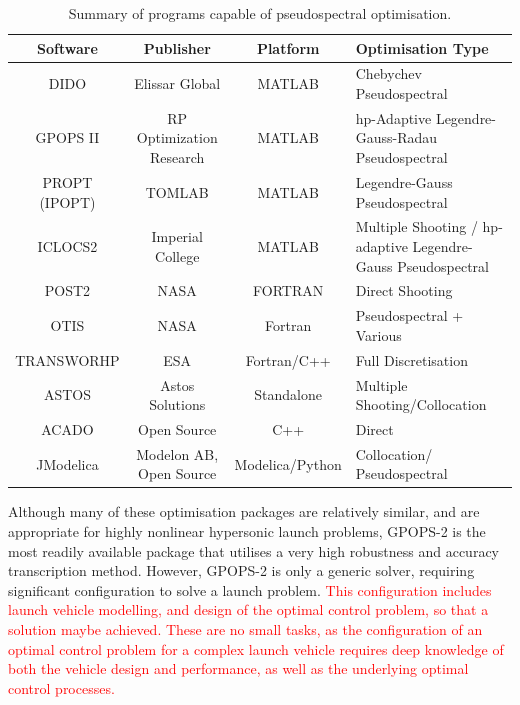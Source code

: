 \begin{table}[ht]
	
	\begin{tabular}{|c|c|c| p{4cm}|}
		\hline \textbf{Software} & \textbf{Publisher} & \textbf{Platform} & \textbf{Optimisation Type} \\ 
		\hline DIDO\cite{Ross2002} & Elissar Global & MATLAB & Chebychev Pseudospectral \\ 
		\hline GPOPS II\cite{Rao2010} & RP Optimization Research & MATLAB & \textsf{hp}-Adaptive Legendre-Gauss-Radau Pseudospectral \\ 
		\hline PROPT (IPOPT)\cite{Rutquist2010}& TOMLAB & MATLAB & Legendre-Gauss  Pseudospectral  \\ 
		\hline ICLOCS2\cite{iclocs} & Imperial College & MATLAB &  Multiple Shooting / \textsf{hp}-adaptive Legendre-Gauss Pseudospectral  \\ 
		\hline POST2\cite{WilliamColson} & NASA & FORTRAN & Direct Shooting \\ 
		\hline OTIS\cite{otis} & NASA  & Fortran & Pseudospectral + Various  \\ 
		\hline TRANSWORHP\cite{Wassel2013} & ESA & Fortran/C++ & Full Discretisation \\ 
		\hline ASTOS\cite{astos} & Astos Solutions & Standalone & Multiple Shooting/Collocation  \\  
		\hline ACADO\cite{Houska2011} & Open Source & C++ &  Direct \\  
		\hline JModelica\cite{jmodelica} & Modelon AB, Open Source & Modelica/Python &  Collocation/ Pseudospectral \\  
		
		\hline 
	\end{tabular} 
	
	\caption{Summary of programs capable of pseudospectral optimisation.}
	\label{table:programs}
\end{table}

Although many of these optimisation packages are relatively similar, and are appropriate for highly nonlinear hypersonic launch problems, GPOPS-2 is the most readily available package that utilises a very high robustness and accuracy transcription method. However, GPOPS-2 is only a generic solver, requiring significant configuration to solve a launch problem. \textcolor{red}{This configuration includes launch vehicle modelling, and design of the optimal control problem, so that a solution maybe achieved. These are no small tasks, as the configuration of an optimal control problem for a complex launch vehicle requires deep knowledge of both the vehicle design and performance, as well as the underlying optimal control processes. } 

